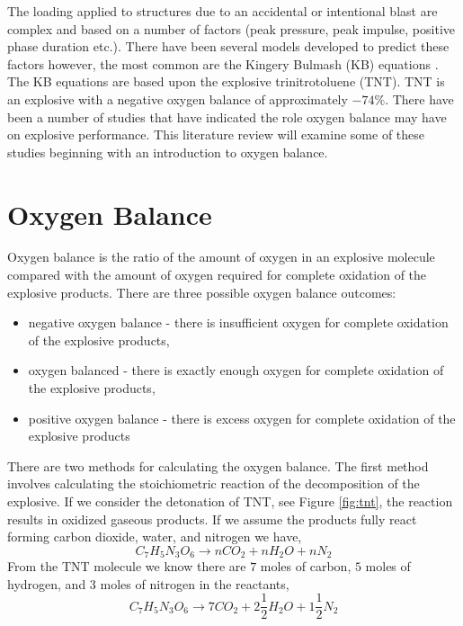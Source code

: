 The loading applied to structures due to an accidental or intentional blast are complex and based on a number of factors (peak pressure, peak  impulse, positive phase duration etc.).  There have been several models developed to predict these factors however, the most common are the Kingery Bulmash (KB) equations \cite{Kingery1984}.  The KB equations are based upon the explosive trinitrotoluene (TNT).  TNT is an explosive with a negative oxygen balance of approximately $-74\%$.  There have been a number of studies that have indicated the role oxygen balance may have on explosive performance.  This literature review will examine some of these studies beginning with an introduction to oxygen balance.

\section{Oxygen Balance}
Oxygen balance is the ratio of the amount of oxygen in an explosive molecule compared with the amount of oxygen required for complete oxidation of the explosive products.  There are three possible oxygen balance outcomes:
\begin{itemize}
\item negative oxygen balance - there is insufficient oxygen for complete oxidation of the explosive products,
\item oxygen balanced - there is exactly enough oxygen for complete oxidation of the explosive products,
\item positive oxygen balance - there is excess oxygen for complete oxidation of the explosive products
\end{itemize}
There are two methods for calculating the oxygen balance.  The first method involves calculating the stoichiometric reaction of the decomposition of the explosive.  If we consider the detonation of TNT, see Figure \ref{fig:tnt}, the reaction results in oxidized gaseous products.  If we assume the products fully react forming carbon dioxide, water, and nitrogen we have,
\begin{equation}\label{eq:tnt_1}
C_7H_5N_3O_6 \rightarrow nCO_2+nH_2O+nN_2
\end{equation}
From the TNT molecule we know there are $7$ moles of carbon, $5$ moles of hydrogen, and $3$ moles of nitrogen in the reactants,
\begin{equation}\label{eq:tnt_2}
C_7H_5N_3O_6 \rightarrow 7CO_2+2\frac{1}{2}H_2O+1\frac{1}{2}N_2
\end{equation}
